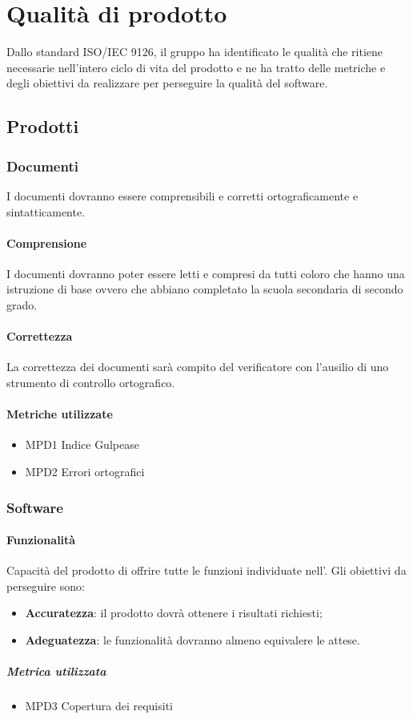 \section{Qualità di prodotto}
Dallo standard ISO/IEC 9126, il gruppo \Gruppo ha identificato le qualità che ritiene necessarie nell'intero ciclo di vita del prodotto e ne ha tratto delle metriche e degli obiettivi da realizzare per perseguire la qualità del software. 
\subsection{Prodotti}
\subsubsection{Documenti}
I documenti dovranno essere comprensibili e corretti ortograficamente e sintatticamente.
\paragraph{Comprensione}
I documenti dovranno poter essere letti e compresi da tutti coloro che hanno una istruzione di base ovvero che abbiano completato la scuola secondaria di secondo grado.
\paragraph{Correttezza}
La correttezza dei documenti sarà compito del verificatore con l'ausilio di uno strumento di controllo ortografico.
\paragraph{Metriche utilizzate}
\begin{itemize}
\item MPD1 Indice Gulpease
\item MPD2 Errori ortografici
\end{itemize} 
\subsubsection{Software}
\paragraph{Funzionalità}
Capacità del prodotto di offrire tutte le funzioni individuate nell'\AdR{}. Gli obiettivi da perseguire sono:
\begin{itemize}
\item \textbf{Accuratezza}: il prodotto dovrà ottenere i risultati richiesti;
\item \textbf{Adeguatezza}: le funzionalità dovranno almeno equivalere le attese.
\end{itemize}
\subparagraph{Metrica utilizzata}
\begin{itemize}
\item MPD3 Copertura dei requisiti
\end{itemize}
